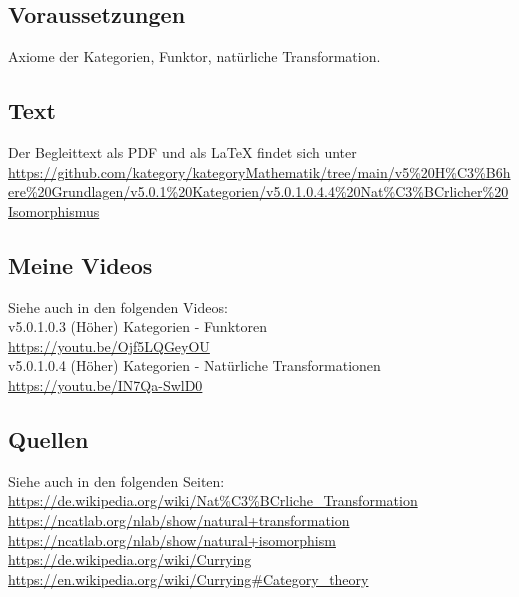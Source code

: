 \documentclass[a4paper]{amsart}
\theoremstyle{definition}
\begin{document}
\subsection*{Voraussetzungen}
Axiome der Kategorien, Funktor, natürliche Transformation.

\subsection*{Text}
Der Begleittext als PDF und als LaTeX findet sich unter
{\tiny
   \url{https://github.com/kategory/kategoryMathematik/tree/main/v5%20H%C3%B6here%20Grundlagen/v5.0.1%20Kategorien/v5.0.1.0.4.4%20Nat%C3%BCrlicher%20Isomorphismus}
}

\subsection*{Meine Videos}
Siehe auch in den folgenden Videos:\\
v5.0.1.0.3 (Höher) Kategorien - Funktoren\\
\url{https://youtu.be/Ojf5LQGeyOU}\\
v5.0.1.0.4 (Höher) Kategorien - Natürliche Transformationen\\
\url{https://youtu.be/IN7Qa-SwlD0}\\


\subsection*{Quellen}
Siehe auch in den folgenden Seiten:\\
\url{https://de.wikipedia.org/wiki/Nat%C3%BCrliche_Transformation}\\
\url{https://ncatlab.org/nlab/show/natural+transformation}\\
\url{https://ncatlab.org/nlab/show/natural+isomorphism}\\
\url{https://de.wikipedia.org/wiki/Currying}\\
\url{https://en.wikipedia.org/wiki/Currying#Category_theory}\\
\url{}\\
\url{}\\
\url{}\\
\url{}\\
\end{document}
